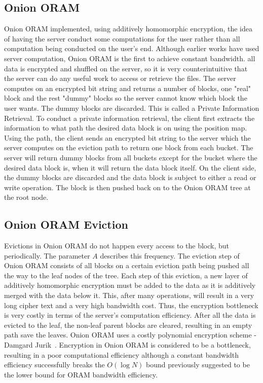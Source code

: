 \documentclass[12pt, oneside]{article}   	%
\begin{document}
\subsection{Onion ORAM}
Onion ORAM implemented, using additively homomorphic encryption, the idea of having the server conduct some computations for the user rather than all computation being conducted on the user's end. Although earlier works have used server computation, Onion ORAM is the first to achieve constant bandwidth. all data is encrypted and shuffled on the server, so it is very counterintuitive that the server can do any useful work to access or retrieve the files. The server computes on an encrypted bit string and returns a number of blocks, one "real" block and the rest "dummy" blocks so the server cannot know which block the user wants. The dummy blocks are discarded. This is called a Private Information Retrieval. To conduct a private information retrieval, the client first extracts the information to what path the desired data block is on using the position map. Using the path, the client sends an encrypted bit string to the server which the server computes on the eviction path to return one block from each bucket. The server will return dummy blocks from all buckets except for the bucket where the desired data block is, when it will return the data block itself. On the client side, the dummy blocks are discarded and the data block is subject to either a read or write operation. The block is then pushed back on to the Onion ORAM tree at the root node. 

\subsection{Onion ORAM Eviction}
Evictions in Onion ORAM do not happen every access to the block, but periodically. The parameter $A$ describes this frequency. The eviction step of Onion ORAM consists of all blocks on a certain eviction path being pushed all the way to the leaf nodes of the tree. Each step of this eviction, a new layer of additively homomorphic encryption must be added to the data as it is additively merged with the data below it. This, after many operations, will result in a very long cipher text and a very high bandwidth cost. Thus, the encryption bottleneck is very costly in terms of the server's computation efficiency. After all the data is evicted to the leaf, the non-leaf parent blocks are cleared, resulting in an empty path save the leaves. Onion ORAM uses a costly polynomial encryption scheme - Damgard Jurik~\cite{damgard}. Encryption in Onion ORAM is considered to be a bottleneck, resulting in a poor computational efficiency although a constant bandwidth efficiency successfully breaks the $O (\log N)$ bound previously suggested to be the lower bound for ORAM bandwidth efficiency.
\end{document}
